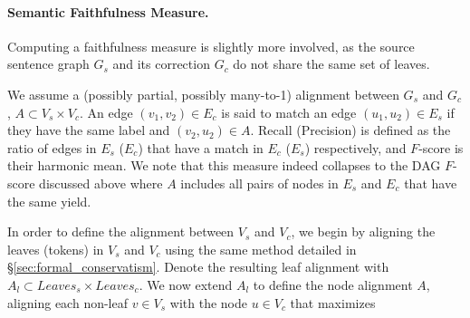 \documentclass[letterpaper, 11pt]{article}
\begin{document}
\paragraph{Semantic Faithfulness Measure.} Computing a faithfulness
measure is slightly more involved, as the source sentence graph $G_s$ and its
correction $G_c$ do not share the same set of leaves.

%
%
We assume a (possibly partial, possibly many-to-1) alignment between $G_s$ and $G_c$,
$A \subset V_s \times V_c$. An edge $(v_1,v_2) \in E_c$ is said to match an edge
$(u_1,u_2) \in E_s$ if they have the same label and $(v_2,u_2) \in A$. Recall (Precision)
is defined as the ratio of edges in $E_s$ ($E_c$) that have a match in $E_c$ ($E_s$) respectively, and
$F$-score is their harmonic mean. We note that this measure indeed collapses to the
DAG $F$-score discussed above where $A$ includes all pairs of nodes in $E_s$ and $E_c$ that have
the same yield.

In order to define the alignment between $V_s$ and $V_c$, we begin by aligning the leaves
(tokens) in $V_s$ and $V_c$ using the same method detailed in \S \ref{sec:formal_conservatism}.
Denote the resulting leaf alignment with $A_l \subset Leaves_s \times Leaves_c$.
We now extend $A_l$ to define the node alignment $A$, aligning each non-leaf $v \in V_s$
with the node $u \in V_c$ that maximizes
\end{document}
